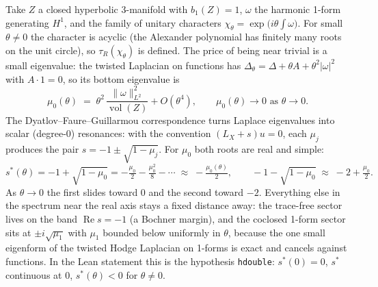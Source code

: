 \documentclass[11pt]{article}
\begin{document}
Take $Z$ a closed hyperbolic 3-manifold with $b_1(Z) = 1$, $\omega$ the harmonic 1-form
generating $H^1$, and the family of unitary characters
$\chi_\theta = \exp\!\big(i\theta\!\int\!\omega\big)$. For small $\theta \neq 0$ the character is
acyclic (the Alexander polynomial has finitely many roots on the unit circle), so $\tau_R(\chi_\theta)$
is defined. The price of being near trivial is a small eigenvalue: the twisted Laplacian on
functions has $\Delta_\theta = \Delta + \theta A + \theta^2|\omega|^2$ with $A\cdot 1 = 0$, so its
bottom eigenvalue is
\[
\mu_0(\theta) \;=\; \theta^2\,\frac{\|\omega\|^2_{L^2}}{\operatorname{vol}(Z)} + O(\theta^4),
\qquad \mu_0(\theta) \to 0 \text{ as } \theta \to 0 .
\]
The Dyatlov--Faure--Guillarmou correspondence turns Laplace eigenvalues into scalar
(degree-0) resonances: with the convention $(L_X + s)u = 0$, each $\mu_j$ produces the pair
$s = -1 \pm \sqrt{1 - \mu_j}$. For $\mu_0$ both roots are real and simple:
\[
s^*(\theta) = -1 + \sqrt{1-\mu_0} = -\tfrac{\mu_0}{2} - \tfrac{\mu_0^2}{8} - \cdots \;\approx\; -\tfrac{\mu_0(\theta)}{2},
\qquad -1 - \sqrt{1-\mu_0} \;\approx\; -2 + \tfrac{\mu_0}{2}.
\]
As $\theta \to 0$ the first slides toward $0$ and the second toward $-2$. Everything else in the
spectrum near the real axis stays a fixed distance away: the trace-free sector lives on the band
$\operatorname{Re} s = -1$ (a Bochner margin), and the coclosed 1-form sector sits at $\pm i\sqrt{\mu_1}$
with $\mu_1$ bounded below uniformly in $\theta$, because the one small eigenform of the twisted
Hodge Laplacian on 1-forms is exact and cancels against functions. In the Lean statement this is
the hypothesis \texttt{hdouble}: $s^*(0) = 0$, $s^*$ continuous at $0$, $s^*(\theta) < 0$ for
$\theta \neq 0$.
\end{document}
